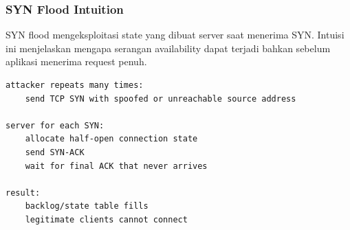 \subsubsection{SYN Flood Intuition}
\begin{jawab}
SYN flood mengeksploitasi state yang dibuat server saat menerima SYN. Intuisi ini menjelaskan mengapa serangan availability dapat terjadi bahkan sebelum aplikasi menerima request penuh.
\end{jawab}

\begin{lstlisting}[caption={Intuisi SYN flood}, label={lst:syn-flood}]
attacker repeats many times:
    send TCP SYN with spoofed or unreachable source address

server for each SYN:
    allocate half-open connection state
    send SYN-ACK
    wait for final ACK that never arrives

result:
    backlog/state table fills
    legitimate clients cannot connect
\end{lstlisting}
